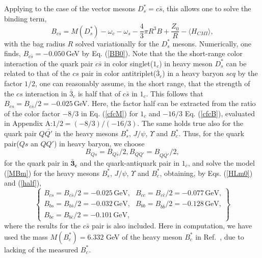 \documentclass[prd,twocolumn,floatfix,nofootinbib]{revtex4}
\begin{document}
Applying to the case of the vector mesons $D_{s}^{\ast }=c\bar{s}$, this
allows one to solve the binding term,
\begin{equation}
B_{c\bar{s}}=M(D_{s}^{\ast })-\omega _{c}-\omega _{s}-\frac{4}{3}\pi R^{3}B+%
\frac{Z_{0}}{R}-\langle H_{CMI}\rangle ,  \label{BB0}
\end{equation}%
with the bag radius $R$ solved variationally for the $D_{s}^{\ast }$ mesons.
Numerically, one finds, $B_{c\bar{s}}=-0.050\,$GeV by Eq. (\ref{BB0}). Note
that the the short-range color interaction of the quark pair $c\bar{s}$ in
color singlet($1_{c}$) in heavy meson $D_{s}^{\ast }$ can be related to that
of the $cs$ pair in color antitriplet($\bar{3}_{c}$) in a heavy baryon $scq$
by the factor $1/2$, one can reasonably assume, in the short range, that the
strength of the $cs$ interaction in $\bar{3}_{c}$ is half that of $c\bar{s}$
in $1_{c}$. This follows that $B_{cs}=B_{c\bar{s}}/2=-0.025\,$GeV. Here, the
factor half can be extracted from the ratio of the color factor $-8/3$ in
Eq. (\ref{cfcM}) for $1_{c}$ and $-16/3$ Eq. (\ref{cfcB}), evaluated in
Appendix A:$1/2=(-8/3)/(-16/3)$. The same holds true also for the quark pair
$Q\bar{Q\prime }$ in the heavy mesons $B_{s}^{\ast }$, $J/\psi $, $\Upsilon $
and $B_{c}^{\ast }$. Thus, for the quark pair($Qs$ an $QQ\prime $) in heavy
baryon, we choose
\begin{equation}
B_{Qs}=B_{Q\bar{s}}/2,B_{QQ\prime }=B_{Q\bar{Q\prime }}/2,  \label{half}
\end{equation}%
for the quark pair in $\boldsymbol{\bar{3}_{c}}$ and the quark-antiquark
pair in $1_{c}$, and solve the model (\ref{MBm}) for the heavy mesons $%
B_{s}^{\ast }$, $J/\psi $, $\Upsilon $ and $B_{c}^{\ast }$, obtaining, by
Eqs. (\ref{HLm0}) and (\ref{half}),
\begin{equation}
\begin{Bmatrix}
B_{cs}=B_{c\bar{s}}/2=-0.025\,\text{GeV,} & B_{cc}=B_{c\bar{c}}/2=-0.077\,%
\text{GeV,} \\
B_{bs}=B_{b\bar{s}}/2=-0.032\,\text{GeV,} & B_{bb}=B_{b\bar{b}}/2=-0.128\,%
\text{GeV,} \\
B_{bc}=B_{b\bar{c}}/2=-0.101\,\text{GeV,} &
\end{Bmatrix}
\label{Bcs}
\end{equation}%
where the results for the $c\bar{s}$ pair is also included. Here in
computation, we have used the mass $M(B_{c}^{\ast })=6.332$ GeV of the heavy
meson $B_{c}^{\ast }$ in Ref.~\cite{Ebert:2002pp}, due to lacking of the
measured $B_{c}^{\ast }$.
\end{document}
